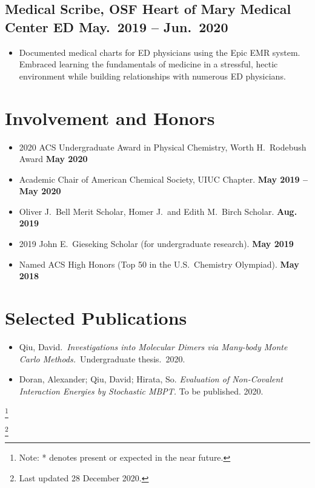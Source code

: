 \documentclass{article}
\begin{document}
\subsection{Medical Scribe, OSF Heart of Mary Medical Center ED \hfill May.\ 2019 -- Jun.\ 2020}
\begin{itemize}[noitemsep, nolistsep]
	\item Documented medical charts for ED physicians using the Epic EMR
		system. Embraced learning the fundamentals of medicine in a
		stressful, hectic environment while building relationships with
		numerous ED physicians.
\end{itemize}

\section{Involvement and Honors}
\begin{itemize}[noitemsep,nolistsep]
	\item 2020 ACS Undergraduate Award in Physical Chemistry, Worth H.\ Rodebush Award
	\hfill\textbf{May 2020}

	\item Academic Chair of American Chemical Society, UIUC Chapter.
	\hfill\textbf{May 2019 -- May 2020}

	\item Oliver J.\ Bell Merit Scholar, Homer J.\ and Edith M.\ Birch
	Scholar.
	\hfill\textbf{Aug. 2019}

	\item 2019 John E.\ Gieseking Scholar (for undergraduate research).
	\hfill\textbf{May 2019}

	\item Named ACS High Honors (Top 50 in the U.S.\ Chemistry Olympiad).
	\hfill\textbf{May 2018}
\end{itemize}

\section{Selected Publications}

\begin{itemize}[noitemsep, nolistsep]
	\item Qiu, David.\ \emph{Investigations into Molecular Dimers via
		Many-body Monte Carlo Methods.}\ Undergraduate thesis.\ 2020.

	\item Doran, Alexander; Qiu, David; Hirata, So. \emph{Evaluation of
		Non-Covalent Interaction Energies by Stochastic MBPT.} To be
		published. 2020.
\end{itemize}

\newcommand\blfootnote[1]{%
	\begingroup
	\renewcommand\thefootnote{}\footnote{#1}%
	\addtocounter{footnote}{-1}%
	\endgroup
}

\blfootnote{Note: * denotes present or expected in the near future.}
\blfootnote{Last updated 28 December 2020.}
\end{document}
